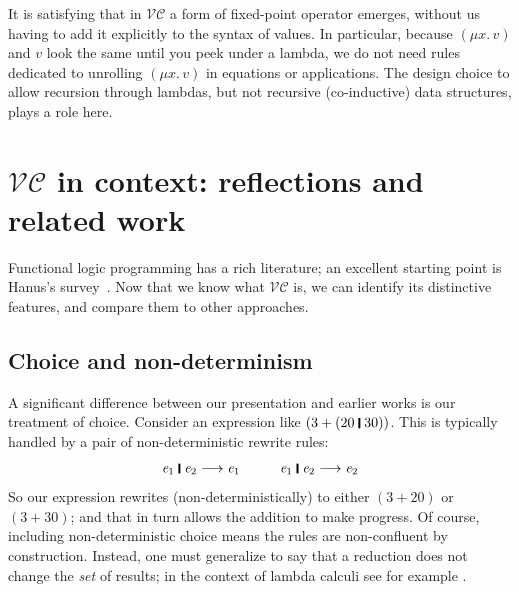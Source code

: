 \documentclass[acmsmall,review,dvipsnames]{acmart}
\newcommand{\Varid}[1]{\mathit{#1}}
\newcommand{\versecalc}{$\mathcal{VC}$}
\newcommand{\movesto}{\longrightarrow}
\begin{document}
It is satisfying that in {\versecalc} a form of fixed-point operator emerges, without us having to add it explicitly to the syntax of values. In particular, because \ensuremath{(\mu\Varid{x}.\,\Varid{v})} and \ensuremath{\Varid{v}} look the same until you peek under a lambda, we do not need rules dedicated to unrolling \ensuremath{(\mu\Varid{x}.\,\Varid{v})} in equations or applications. The design choice to allow recursion through lambdas, but not recursive (co-inductive) data structures, plays a role here.


\section{\versecalc{} in context: reflections and related work} \label{sec:related}

Functional logic programming has a rich literature; an excellent
starting point is Hanus's survey~\cite{hanus:survey}.  Now that we
know what \versecalc{} is, we can identify its distinctive features,
and compare them to other approaches.

\subsection{Choice and non-determinism} \label{sec:deterministic}

A significant difference between our presentation and earlier works is our
treatment of choice. Consider an expression like \ensuremath{(\mathrm{3}\mathbin{+}(\mathrm{20}\;\rule[-0.3mm]{0.5mm}{2.5mm}\;\mathrm{30}))}.
This is typically handled by a pair of non-deterministic rewrite rules:
$$
\ensuremath{\Varid{e}_{\mathrm{1}}\;\rule[-0.3mm]{0.5mm}{2.5mm}\;\Varid{e}_{\mathrm{2}}} \movesto \ensuremath{\Varid{e}_{\mathrm{1}}} \hspace{1cm} \ensuremath{\Varid{e}_{\mathrm{1}}\;\rule[-0.3mm]{0.5mm}{2.5mm}\;\Varid{e}_{\mathrm{2}}} \movesto \ensuremath{\Varid{e}_{\mathrm{2}}}
$$
So our expression rewrites (non-deterministically) to either \ensuremath{(\mathrm{3}\mathbin{+}\mathrm{20})} or \ensuremath{(\mathrm{3}\mathbin{+}\mathrm{30})};
and that in turn allows the addition to make progress.
Of course, including non-deterministic choice means the rules are non-confluent by
construction.  Instead, one must generalize to say that a reduction does not change the
\emph{set} of results; in the context of lambda calculi see
for example \cite{schmidt-schauss:non-det1,schmidt-schauss:non-det2}.
\end{document}

